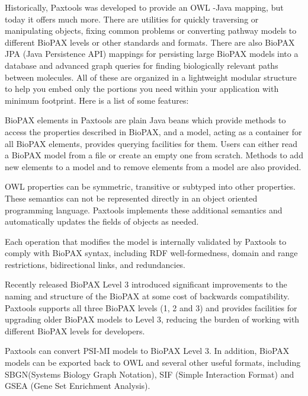 \documentclass{tufte-book}
\begin{document}
Historically, Paxtools was developed to provide an OWL -Java mapping, but today it offers much more. There are utilities for quickly traversing or manipulating objects, fixing common problems or converting pathway models to different BioPAX levels or other standards and formats. There are also BioPAX JPA (Java Persistence API) mappings for persisting large BioPAX models into a database and advanced graph queries for finding biologically relevant paths between molecules. All of these are organized in a lightweight modular structure to help you embed only the portions you need within your application with minimum footprint. Here is a list of some features:

 BioPAX elements in Paxtools are plain Java beans which provide methods to access the properties described in BioPAX, and a model, acting as a container for all BioPAX elements, provides querying facilities for them. Users can either read a BioPAX model from a file or create an empty one from scratch. Methods to add new elements to a model and to remove elements from a model are also provided.

 OWL properties can be symmetric, transitive or subtyped into other properties. These semantics can not be represented directly in an object oriented programming language. Paxtools implements these additional semantics and automatically updates the fields of objects as needed.

 Each operation that modifies the model is internally validated by Paxtools to comply with BioPAX syntax, including RDF well-formedness, domain and range restrictions, bidirectional links, and redundancies.

 Recently released BioPAX Level 3 introduced significant improvements to the naming and structure of the BioPAX at some cost of backwards compatibility. Paxtools supports all three BioPAX levels (1, 2 and 3) and provides facilities for upgrading older BioPAX models to Level 3, reducing the burden of working with different BioPAX levels for developers.

 Paxtools can convert PSI-MI\cite{Kerrien2007} models to BioPAX Level 3. In addition, BioPAX models can be exported back to OWL and several other useful formats, including  SBGN(Systems Biology Graph Notation)\cite{Le_Novère2009}, SIF (Simple Interaction Format) and GSEA (Gene Set Enrichment Analysis)\cite{Subramanian2005}.
\end{document}
